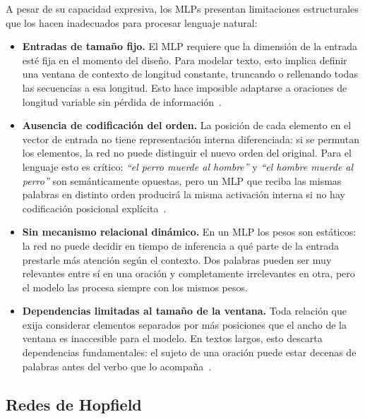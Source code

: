 A pesar de su capacidad expresiva, los MLPs presentan limitaciones
estructurales que los hacen inadecuados para procesar lenguaje natural:

\begin{itemize}
    \item \textbf{Entradas de tamaño fijo.} El MLP requiere que la dimensión
    de la entrada esté fija en el momento del diseño. Para modelar texto,
    esto implica definir una ventana de contexto de longitud constante,
    truncando o rellenando todas las secuencias a esa longitud. Esto hace
    imposible adaptarse a oraciones de longitud variable sin pérdida de
    información~\cite{bengio2003neural}.

    \item \textbf{Ausencia de codificación del orden.} La posición de cada
    elemento en el vector de entrada no tiene representación interna
    diferenciada: si se permutan los elementos, la red no puede distinguir
    el nuevo orden del original. Para el lenguaje esto es crítico: \textit{``el
    perro muerde al hombre''} y \textit{``el hombre muerde al perro''} son
    semánticamente opuestas, pero un MLP que reciba las mismas palabras en
    distinto orden producirá la misma activación interna si no hay codificación
    posicional explícita~\cite{goodfellow2016deeplearning}.

    \item \textbf{Sin mecanismo relacional dinámico.} En un MLP los pesos son
    estáticos: la red no puede decidir en tiempo de inferencia a qué parte de
    la entrada prestarle más atención según el contexto. Dos palabras pueden
    ser muy relevantes entre sí en una oración y completamente irrelevantes
    en otra, pero el modelo las procesa siempre con los mismos pesos.

    \item \textbf{Dependencias limitadas al tamaño de la ventana.} Toda
    relación que exija considerar elementos separados por más posiciones que
    el ancho de la ventana es inaccesible para el modelo. En textos largos,
    esto descarta dependencias fundamentales: el sujeto de una oración puede
    estar decenas de palabras antes del verbo que lo acompaña~\cite{bengio2003neural}.
\end{itemize}

\subsection{Redes de Hopfield}
\label{subsec:hopfield}

